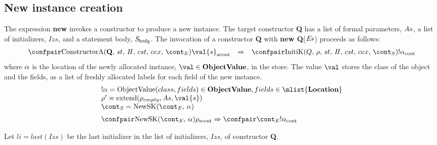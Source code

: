 \documentclass{article}
\DeclareMathOperator{\extend}{extend}
\begin{document}
\subsection{New instance creation}

The expression \textbf{new} invokes a constructor to produce a new instance.
The target constructor \textbf{Q} has a list of formal parameters, $As$, a list of initializers, $Izs$, and a statement body, $\mathit{S}_{body}$.
The invocation of a constructor \textbf{Q} with \textbf{new Q}($\mathit{E}\mathit{s}$) proceeds as follows:
\[
  \begin{array}{lcl}
	\acontconf{\ConstructorA{\textbf{Q}}{\econt}}{\val{s}}
	& \Rightarrow &
	\contconf{\InitK{Q}{\env}{\scont}}{!\loc}
  \end{array}
\]
\noindent
where $\alpha$ is the location of the newly allocated instance, $\val \in \dobjval$, in the store.
The value $\val$ stores the class of the object and the fields, as a list of freshly allocated labels for each field of the new instance.
\[
  \begin{array}{l}
	\deref{\loc} = \objval \in \dobjval, fields \in \mlist{\dlocation}\\
	\env' = \extend(\env_{empty}, \formals, \val{s})\\
	\scont = \NewSK{\econt}{\loc} \\[2mm]

	\scontconf{\NewSK{\econt}{\loc}}{\env}
	\Rightarrow
	\contconf{\econt}{\deref{\loc}}
  \end{array}
\]

\noindent
Let $li = last(Izs)$ be the last initializer in the list of initializers, $Izs$, of constructor \textbf{Q}.
\end{document}
